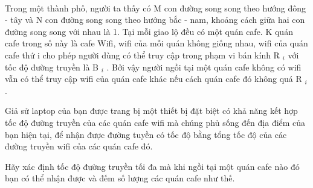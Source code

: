  

Trong một thành phố, người ta thấy có M con đường song song theo hướng đông - tây và N con đường song song theo hướng bắc - nam, khoảng cách giữa hai con đường song song với nhau là 1. Tại mỗi giao lộ đều có một quán cafe. K quán cafe trong số này là cafe Wifi, wifi của mỗi quán không giống nhau, wifi của quán cafe thứ i cho phép người dùng có thể truy cập trong phạm vi bán kính R $_ i $ với tốc độ đường truyền là B $_ i $ . Bởi vậy người ngồi tại một quán cafe không có wifi vẫn có thể truy cập wifi của quán cafe khác nếu cách quán cafe đó không quá R $_ i $ .

Giả sử laptop của bạn được trang bị một thiết bị đặt biệt có khả năng kết hợp tốc độ đường truyền của các quán cafe wifi mà chúng phủ sống đến địa điểm của bạn hiện tại, để nhận được đường tuyền có tốc độ bằng tổng tốc độ của các đường truyền wifi của các quán cafe đó.

Hãy xác định tốc độ đường truyền tối đa mà khi ngồi tại một quán cafe nào đó bạn có thể nhận được và đếm số lượng các quán cafe như thế.